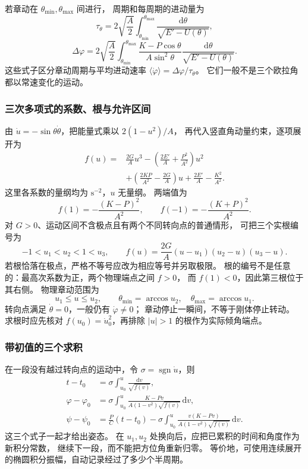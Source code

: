 \documentclass[UTF8,zihao=-4,fontset=fandol,a4paper]{ctexart}
\newcommand{\dd}{\mathrm d}
\begin{document}
若章动在 $\theta_{\min},\theta_{\max}$ 间进行，
周期和每周期的进动量为
\[
\tau_\theta=2\sqrt{\frac A2}
\int_{\theta_{\min}}^{\theta_{\max}}\frac{\dd\theta}{\sqrt{E'-U(\theta)}},
\]
\[
\Delta\varphi=2\sqrt{\frac A2}
\int_{\theta_{\min}}^{\theta_{\max}}
\frac{K-P\cos\theta}{A\sin^2\theta}
\frac{\dd\theta}{\sqrt{E'-U(\theta)}}.
\]
这些式子区分章动周期与平均进动速率
$\langle\dot\varphi\rangle=\Delta\varphi/\tau_\theta$。
它们一般不是三个欧拉角都以常速变化的运动。


\subsubsection*{三次多项式的系数、根与允许区间}
由 $\dot u=-\sin\theta\dot\theta$，把能量式乘以 $2(1-u^2)/A$，
再代入竖直角动量约束，逐项展开为
\[
\begin{aligned}
f(u)={}&\frac{2G}{A}u^3
-\left(\frac{2E'}A+\frac{P^2}{A^2}\right)u^2\\
&+\left(\frac{2KP}{A^2}-\frac{2G}A\right)u
+\frac{2E'}A-\frac{K^2}{A^2}.
\end{aligned}
\]
这里各系数的量纲均为 $\mathrm{s^{-2}}$，$u$ 无量纲。
两端值为
\[
f(1)=-\frac{(K-P)^2}{A^2},\qquad
f(-1)=-\frac{(K+P)^2}{A^2}.
\]
对 $G>0$、运动区间不含极点且有两个不同转向点的普通情形，
可把三个实根编号为
\[
-1<u_1<u_2<1<u_3,
\qquad
f(u)=\frac{2G}{A}(u-u_1)(u_2-u)(u_3-u).
\]
若根恰落在极点，严格不等号应改为相应等号并另取极限。
根的编号不是任意的：最高次系数为正，两个物理端点之间 $f>0$，
而 $f(1)<0$，因此第三根位于其右侧。
物理章动范围为
\[
u_1\le u\le u_2,\qquad
\theta_{\min}=\arccos u_2,\quad
\theta_{\max}=\arccos u_1.
\]
转向点满足 $\dot\theta=0$，一般仍有 $\dot\varphi\ne0$；
章动停止一瞬间，不等于刚体停止转动。
求根时应先核对 $f(u_0)=\dot u_0^2$，再排除 $|u|>1$ 的根作为实际倾角端点。

\subsubsection*{带初值的三个求积}
在一段没有越过转向点的运动中，令 $\sigma=\operatorname{sgn}\dot u$，则
\[
\begin{aligned}
t-t_0&=\sigma\int_{u_0}^{u}\frac{\dd v}{\sqrt{f(v)}},\\
\varphi-\varphi_0&=\sigma\int_{u_0}^{u}
\frac{K-Pv}{A(1-v^2)\sqrt{f(v)}}\,\dd v,\\
\psi-\psi_0&=\frac PC(t-t_0)
-\sigma\int_{u_0}^{u}
\frac{v(K-Pv)}{A(1-v^2)\sqrt{f(v)}}\,\dd v.
\end{aligned}
\]
这三个式子一起才给出姿态。
在 $u_1,u_2$ 处换向后，应把已累积的时间和角度作为新积分常数，
继续下一段，而不能把方位角重新归零。
等价地，可使用连续展开的椭圆积分振幅，自动记录经过了多少个半周期。
\end{document}
